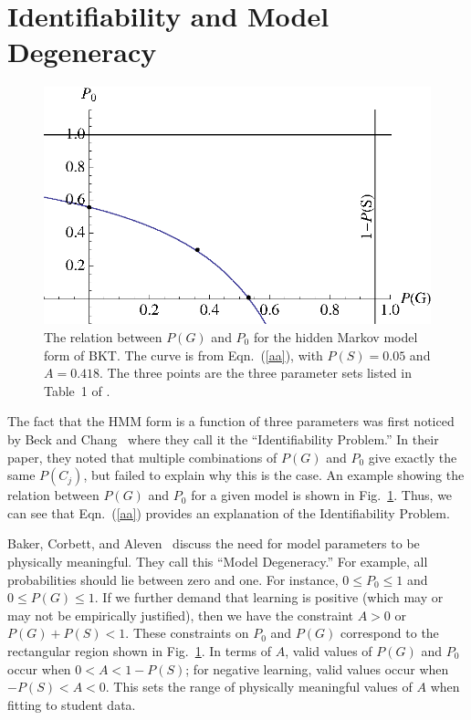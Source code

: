 \documentclass{acmlarge-edm}
\begin{document}
\section{Identifiability and Model Degeneracy}

\begin{figure}
\centering\includegraphics{table1.eps}
\caption{The relation between $P(G)$ and $P_0$ for the hidden
  Markov model form of BKT.  
  The curve is from Eqn.~(\ref{aa}), with $P(S)=0.05$ and $A=0.418$.
  The three points are the three parameter sets listed in Table~1 of
  \cite{beck_identifiability:_2007}.
}
 \label{table1}
\end{figure}

The fact that the HMM form is a function of three parameters
was first noticed by Beck and Chang~\citeyear{beck_identifiability:_2007} 
where they call it the ``Identifiability Problem.''   In their paper, 
they noted that multiple
combinations of $P(G)$ and $P_0$ give exactly the same $P(C_j)$, but
failed to explain why this is the case.  An example showing the relation
between $P(G)$ and $P_0$ for a given model is shown in Fig.~\ref{table1}.
Thus, we can see that Eqn.~(\ref{aa}) provides an explanation of the
Identifiability Problem.

Baker, Corbett, and Aleven~\citeyear{baker_more_2008} discuss the need for 
model parameters to be physically meaningful.  They call this 
``Model Degeneracy.''   For example, all probabilities should lie between 
zero and one.  For instance, $0\le P_0\le 1$ and $0\le P(G) \le 1$.
If we further demand that learning is positive (which may or may not be
empirically justified), then we have the constraint $A>0$ or $P(G)+P(S)<1$.
These constraints on $P_0$ and $P(G)$ correspond to the rectangular region shown in Fig.~\ref{table1}.
In terms of $A$, valid values of $P(G)$ and $P_0$ occur when
$0<A<1-P(S)$; for negative learning, valid values occur when
$-P(S)<A<0$.  This sets the range of physically meaningful values of
$A$ when fitting to student data.
\end{document}
